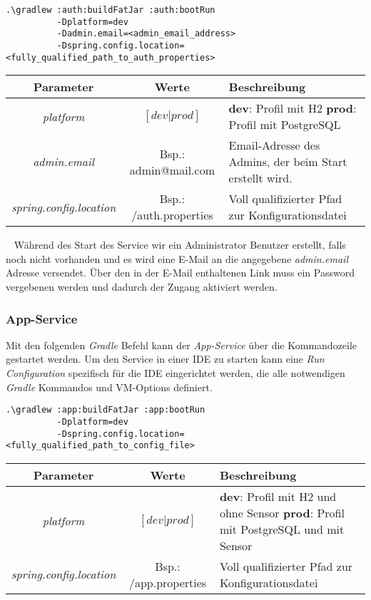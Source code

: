 \documentclass[]{article}
\begin{document}
{\begin{verbatim}
.\gradlew :auth:buildFatJar :auth:bootRun
          -Dplatform=dev
          -Dadmin.email=<admin_email_address>                
          -Dspring.config.location=<fully_qualified_path_to_auth_properties>
\end{verbatim}
{\renewcommand{\arraystretch}{2}%
\begin{center}
	\begin{tabular}{| c | c | p{8.3cm} |}
		\hline
		\textbf{Parameter} & \textbf{Werte} & \textbf{Beschreibung}  \\ \hline
		\textit{platform} & $[dev|prod]$ & \textbf{dev}: Profil mit H2 \newline
		\textbf{prod}: Profil mit PostgreSQL
		\\ \hline
		\textit{admin.email} & Bsp.: admin@mail.com & Email-Adresse des Admins, der beim Start erstellt wird. \\ \hline
		\textit{spring.config.location} & Bsp.: /auth.properties & Voll qualifizierter Pfad zur Konfigurationsdatei  \\ \hline
	\end{tabular}
\end{center}
\ \newline
Während des Start des Service wir ein Administrator Benutzer erstellt, falls noch nicht vorhanden und es wird eine E-Mail an die angegebene \emph{admin.email} Adresse versendet. Über den in der E-Mail enthaltenen Link muss ein Password vergebenen werden und dadurch der Zugang aktiviert werden.
\subsubsection{App-Service}
Mit den folgenden \emph{Gradle} Befehl kann der \emph{App-Service} über die Kommandozeile gestartet werden. Um den Service in einer IDE zu starten kann eine \emph{Run Configuration} spezifisch für die IDE eingerichtet werden, die alle notwendigen \emph{Gradle} Kommandos und VM-Options definiert.
\begin{verbatim}
.\gradlew :app:buildFatJar :app:bootRun
	      -Dplatform=dev              
	      -Dspring.config.location=<fully_qualified_path_to_config_file>
\end{verbatim}
{\renewcommand{\arraystretch}{2}%
\begin{center}
	\begin{tabular}{| c | c | p{8.3cm} |}
		\hline
		\textbf{Parameter} & \textbf{Werte} & \textbf{Beschreibung}  \\ \hline
		\textit{platform} & $[dev|prod]$ & \textbf{dev}: Profil mit H2 und ohne Sensor \newline
		\textbf{prod}: Profil mit PostgreSQL und mit Sensor \\ \hline
		\textit{spring.config.location} & Bsp.: /app.properties & Voll qualifizierter Pfad zur Konfigurationsdatei  \\ \hline
	\end{tabular}
\end{center}

}}}
\end{document}

